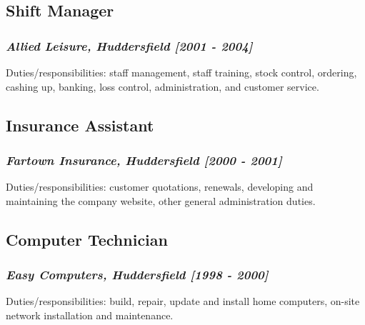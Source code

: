 \documentclass{article}
\begin{document}
\subsection*{Shift Manager}
\subsubsection*{\emph{Allied Leisure, Huddersfield [2001 - 2004]}}
Duties/responsibilities: staff management, staff training, stock control, ordering, cashing up, banking, loss control, administration, and customer service.
\subsection*{Insurance Assistant}
\subsubsection*{\emph{Fartown Insurance, Huddersfield [2000 - 2001]}}
Duties/responsibilities: customer quotations, renewals, developing and maintaining the company website, other general administration duties.
\subsection*{Computer Technician}
\subsubsection*{\emph{Easy Computers, Huddersfield [1998 - 2000]}}
Duties/responsibilities: build, repair, update and install home computers, on-site network installation and maintenance.
\end{document}
